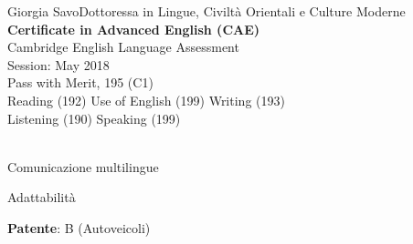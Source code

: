 \documentclass{article}
\begin{document}
\begin{cv}[avatar]{Giorgia Savo}{Dottoressa in Lingue, Civiltà Orientali e Culture Moderne}
\scriptsize \textbf{Certificate in Advanced English (CAE)}\\
Cambridge English Language Assessment\\
Session: May 2018\\
Pass with Merit, 195 (C1)\\
Reading (192) Use of English (199) Writing (193)\\Listening (190) Speaking (199)\\
\\
\normalsize
{}
\normalsize


\begin{cvitem}
    Comunicazione multilingue
\end{cvitem}

\cvseparator
\begin{cvitem}
    Adattabilità
\end{cvitem}


\begin{cvitem}
	\textbf{Patente}: B (Autoveicoli)
\end{cvitem}


\end{cv}

\end{document}
